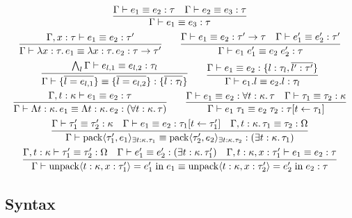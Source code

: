 \begin{gather*}
  \infer{\Gamma \vdash e_1 \equiv e_3: \tau}{
    \Gamma \vdash e_1 \equiv e_2: \tau
    &
    \Gamma \vdash e_2 \equiv e_3: \tau
  }
  \\
  \infer{\Gamma \vdash \lambda x: \tau\ldotp e_1 \equiv \lambda x: \tau\ldotp e_2: \tau \to \tau'}{
    \Gamma, x: \tau \vdash e_1 \equiv e_2: \tau'
  }
  \hspace{2em}
  \infer{\Gamma \vdash e_1\; e'_1 \equiv e_2\; e'_2: \tau}{
    \Gamma \vdash e_1 \equiv e_2: \tau' \to \tau
    &
    \Gamma \vdash e'_1 \equiv e'_2: \tau'
  }
  \\
  \infer{\Gamma \vdash \{\overline{l = e_{l,1}}\} \equiv \{\overline{l = e_{l,2}}\}: \{\overline{l: \tau_l}\}}{
    \bigwedge_l \Gamma \vdash e_{l,1} \equiv e_{l,2}: \tau_l
  }
  \hspace{2em}
  \infer{\Gamma \vdash e_1.l \equiv e_2.l: \tau_l}{
    \Gamma \vdash e_1 \equiv e_2: \{l: \tau_l, \overline{l': \tau'}\}
  }
  \\
  \infer{\Gamma \vdash \Lambda t: \kappa\ldotp e_1 \equiv \Lambda t: \kappa\ldotp e_2: (\forall t: \kappa\ldotp \tau)}{
    \Gamma, t: \kappa \vdash e_1 \equiv e_2: \tau
  }
  \hspace{2em}
  \infer{\Gamma \vdash e_1\; \tau_1 \equiv e_2\; \tau_2: \tau[t \assign \tau_1]}{
    \Gamma \vdash e_1 \equiv e_2: \forall t: \kappa\ldotp \tau
    &
    \Gamma \vdash \tau_1 \equiv \tau_2: \kappa
  }
  \\
  \infer{\Gamma \vdash \sympack\langle \tau'_1, e_1\rangle_{\exists t: \kappa\ldotp \tau_1} \equiv \sympack\langle \tau'_2, e_2\rangle_{\exists t: \kappa\ldotp \tau_2}: (\exists t: \kappa\ldotp \tau_1)}{
    \Gamma \vdash \tau'_1 \equiv \tau'_2: \kappa
    &
    \Gamma \vdash e_1 \equiv e_2: \tau_1[t \assign \tau'_1]
    &
    \Gamma, t: \kappa\ldotp \tau_1 \equiv \tau_2: \Omega
  }
  \\
  \infer{\Gamma \vdash \symunpack\langle t: \kappa, x: \tau'_1\rangle = e'_1 \symin e_1 \equiv \symunpack\langle t: \kappa, x: \tau'_2\rangle = e'_2 \symin e_2: \tau}{
    \Gamma, t: \kappa \vdash \tau'_1 \equiv \tau'_2: \Omega
    &
    \Gamma \vdash e'_1 \equiv e'_2: (\exists t: \kappa\ldotp \tau'_1)
    &
    \Gamma, t: \kappa, x: \tau'_1 \vdash e_1 \equiv e_2: \tau
  }
\end{gather*}

\subsection{Syntax}

